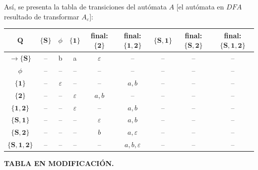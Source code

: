 \documentclass{article}
\begin{document}
\begin{enumerate}
  Así, se presenta la tabla de transiciones del autómata $A$ [el autómata en $DFA$
    resultado de transformar $A_{\varepsilon}$]:
  \begin{center}
    \begin{tabular}{| c | c | c | c | c | c | c | c | c |}
      \hline
      $\mathbf{Q}$ & $\mathbf{\{S\}}$ & $\phi$ & $\mathbf{\{1\}}$ & final: $\mathbf{\{2\}}$ & final: $\mathbf{\{1,2\}}$ & $\mathbf{\{S,1\}}$ & final: $\mathbf{\{S,2\}}$ & final: $\mathbf{\{S, 1, 2\}}$\\ \hline
      $\rightarrow \mathbf{\{S\}}$ & -- & b & a & $\varepsilon$ & -- & -- & -- & -- \\ \hline
      $\phi$  & -- & -- & -- & -- & -- & --  & -- & -- \\ \hline
      $\mathbf{\{1\}}$  & -- & $\varepsilon$ & -- & -- & $a, b$ & --  & -- & -- \\\hline
      $\mathbf{\{2\}}$  & -- & -- & $\varepsilon$ & $a,b$ & -- & --  & -- & -- \\\hline
      $\mathbf{\{1,2\}}$  & -- & -- & $\varepsilon$ & -- & $a,b$ & -- & -- & -- \\\hline
      $\mathbf{\{S,1\}}$  & -- & -- & -- & $\varepsilon$ & $a,b$ & -- & -- & -- \\\hline
      $\mathbf{\{S,2\}}$  & -- & -- & -- & $b$ & $a, \varepsilon$ & -- & -- & --  \\\hline
      $\mathbf{\{S,1,2\}}$  & -- & -- & -- & -- & $a,b,\varepsilon$ & --  & -- & -- \\\hline
    \end{tabular} 
  \end{center}
  \textbf{TABLA EN MODIFICACIÓN.}
  

\end{enumerate}
\end{document}
